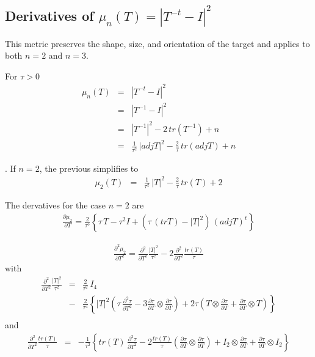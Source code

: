 \documentclass{report}
\begin{document}
\subsection{Derivatives of $\mu_n(T)=|T^{-t}-I|^2$ \label{sso+2}}

\noindent This metric preserves the shape, size, and orientation of the target
and applies to both $n=2$ and $n=3$. \newline

\noindent For $\tau>0$
\begin{eqnarray}
\mu_n (T) & = & |T^{-t}-I|^2 \\
          & = & |T^{-1}-I|^2  \\
          & = & |T^{-1}|^2 - 2 \, tr(T^{-1}) + n \\
          & = & \frac{1}{\tau^2} \, |adj T|^2 - \frac{2}{\tau} \, tr(adj T) + n
\end{eqnarray}

. \newline
If $n=2$, the previous simplifies to
\begin{eqnarray}
\mu_2 (T) & = &  \frac{1}{\tau^2} \, |T|^2 - \frac{2}{\tau} \, tr(T) + 2
\end{eqnarray}

\noindent The dervatives for the case $n=2$ are
\begin{eqnarray}
\frac{\partial \mu_2}{\partial T} = \frac{2}{\tau^3} \left\{ \tau \, T - \tau^2 I + \left( \tau \, (tr T) - |T|^2 \right) \, (adj T)^t \right\}
\end{eqnarray}


\begin{eqnarray}
\frac{\partial^2 \mu_2}{\partial T^2} = \frac{\partial^2}{\partial T^2} \frac{|T|^2}{\tau^2} - 2 \frac{\partial^2}{\partial T^2} \frac{tr(T)}{\tau}
\end{eqnarray}
with
\begin{eqnarray}
 \frac{\partial^2}{\partial T^2} \frac{|T|^2}{\tau^2} & = & \frac{2}{\tau^2} \, I_{4} \nonumber \\
 & - & \frac{2}{\tau^4} \left\{ |T|^2 \left( \tau \, \frac{\partial^2 \tau}{\partial T^2} - 3 \frac{\partial \tau}{\partial T} \otimes \frac{\partial \tau}{\partial T}  \right) + 2 \tau \left( T \otimes \frac{\partial \tau}{\partial T} + \frac{\partial \tau}{\partial T} \otimes T \right) \right\} \nonumber \\
\end{eqnarray}
and 
\begin{eqnarray}
 \frac{\partial^2}{\partial T^2} \frac{tr(T)}{\tau} & = & -\frac{1}{\tau^2} \left\{ tr(T) \, \frac{\partial^2 \tau}{\partial T^2} -2 \frac{tr(T)}{\tau} \left( \frac{\partial \tau}{\partial T} \otimes \frac{\partial \tau}{\partial T} \right) + I_2 \otimes \frac{\partial \tau}{\partial T} + \frac{\partial \tau}{\partial T} \otimes I_2 \right\} \nonumber \\
\end{eqnarray}
\end{document}
